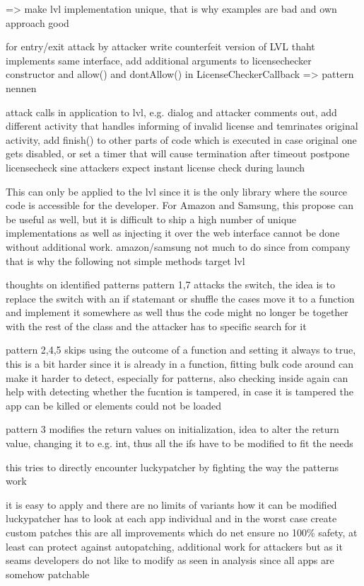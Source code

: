 => make lvl implementation unique, that is why examples are bad and own approach good \cite{developersSecuring}

for entry/exit \cite{developersSecuring}
attack by attacker write counterfeit version of LVL thaht implements same interface, add additional arguments to licensechecker constructor and allow() and dontAllow() in LicenseCheckerCallback => pattern nennen \cite{developersSecuring}

attack calls in application to lvl, e.g. dialog and attacker comments out, add different activity that handles informing of invalid license and temrinates original activity, add finish() to other parts of code which is executed in case original one gets disabled, or set a timer that will cause termination after timeout \cite{developersSecuring}
postpone licensecheck sine attackers expect instant license check during launch \cite{developersSecuring}

This can only be applied to the \gls{lvl} since it is the only library where the source code is accessible for the developer.
For Amazon and Samsung, this propose can be useful as well, but it is difficult to ship a high number of unique implementations as well as injecting it over the web interface cannot be done without additional work.
amazon/samsung not much to do since from company that is why the following not simple methods target lvl\cite{munteanLicense}

thoughts on identified patterns
pattern 1,7 attacks the switch, the idea is to replace the switch with an if statemant or shuffle the cases
move it to a function and implement it somewhere as well thus the code might no longer be together with the rest of the class and the attacker has to specific search for it

pattern 2,4,5 skips using the outcome of a function and setting it always to true, this is a bit harder since it is already in a function, fitting bulk code around can make it harder to detect, especially for patterns, also checking inside again can help with detecting whether the fucntion is tampered, in case it is tampered the app can be killed or elements could not be loaded

pattern 3 modifies the return values on initialization, idea to alter the return value, changing it to e.g. int, thus all the ifs have to be modified to fit the needs


this tries to directly encounter luckypatcher by fighting the way the patterns work

it is easy to apply and there are no limits of variants how it can be modified
luckypatcher has to look at each app individual and in the worst case create custom patches
this are all improvements which do net ensure no 100\% safety, at least can protect against autopatching, additional work for attackers
but as it seams developers do not like to modify as seen in analysis since all apps are somehow patchable
